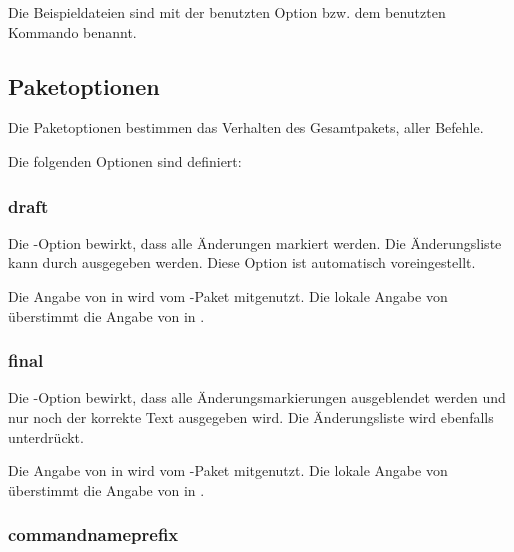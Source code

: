 Die Beispieldateien sind mit der benutzten Option bzw. dem benutzten Kommando benannt.

\subsection{Paketoptionen}
\label{sec:ui:options}


Die Paketoptionen bestimmen das Verhalten des Gesamtpakets, \dh aller Befehle.

Die folgenden Optionen sind definiert:

\localtableofcontents



\subsubsection{draft}


Die -Option bewirkt, dass alle Änderungen markiert werden.
Die Änderungsliste kann durch  ausgegeben werden.
Diese Option ist automatisch voreingestellt.

Die Angabe von  in  wird vom -Paket mitgenutzt.
Die lokale Angabe von  überstimmt die Angabe von  in .


\subsubsection{final}


Die -Option bewirkt, dass alle Änderungsmarkierungen ausgeblendet werden und nur noch der korrekte Text ausgegeben wird.
Die Änderungsliste wird ebenfalls unterdrückt.

Die Angabe von  in  wird vom -Paket mitgenutzt.
Die lokale Angabe von  überstimmt die Angabe von  in .


\subsubsection{commandnameprefix}
\label{sec:ui:options:commandnameprefix}

